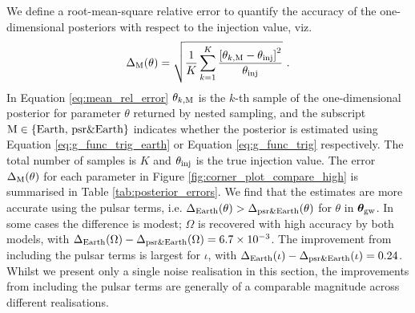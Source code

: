 \documentclass[fleqn,usenatbib,useAMS]{mnras}
\begin{document}
We define a root-mean-square relative error to quantify the accuracy of the one-dimensional posteriors with respect to the injection value, viz.
\begin{equation}
\Delta_{\rm M}(\theta) = \sqrt{\frac{1}{K}\sum_{k=1}^{K} \frac{ \left[\theta_{k,\rm M} - \theta_{\rm inj}\right]^2}{\theta_{\rm inj}}} \ . \label{eq:mean_rel_error}
\end{equation}
In Equation \eqref{eq:mean_rel_error} $\theta_{k,\rm M}$ is the $k$-th sample of the one-dimensional posterior for parameter $\theta$ returned by nested sampling, and the subscript $\rm M \in \{ \text{Earth, psr\&Earth} \}$ indicates whether the posterior is estimated using Equation \eqref{eq:g_func_trig_earth} or Equation \eqref{eq:g_func_trig} respectively. The total number of samples is $K$ and $\theta_{\rm inj}$ is the true injection value. The error $\Delta_{\rm M}(\theta)$ for each parameter in Figure \ref{fig:corner_plot_compare_high} is summarised in Table \ref{tab:posterior_errors}. We find that the estimates are more accurate using the pulsar terms, i.e. $\Delta_{\rm Earth}(\theta) > \Delta_{\rm psr \& Earth}(\theta)$ for $\theta$ in $\boldsymbol{\theta}_{\rm gw}$. In some cases the difference is modest;  $\Omega$ is recovered with high accuracy by both models, with $\Delta_{\rm Earth}(\Omega)-\Delta_{\rm psr \& Earth}(\Omega) = 6.7 \times 10^{-3}$. The improvement from including the pulsar terms is largest for $\iota$, with $\Delta_{\rm Earth}(\iota) - \Delta_{\rm psr \& Earth}(\iota)  = 0.24$. Whilst we present only a single noise realisation in this section, the improvements from including the pulsar terms are generally of a comparable magnitude across different realisations. \newline 
\end{document}
